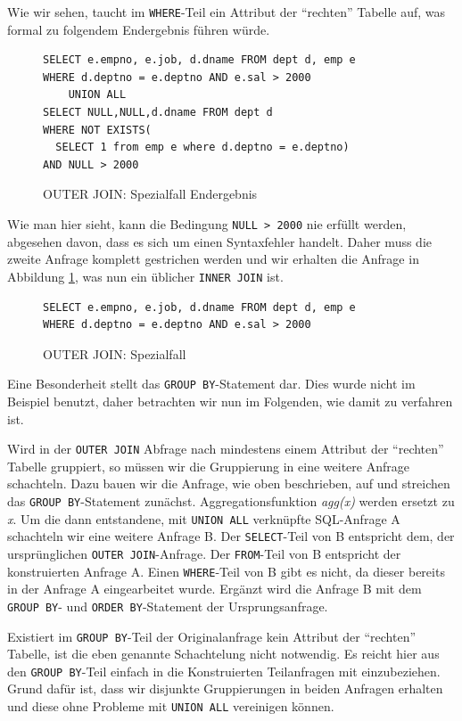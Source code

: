 Wie wir sehen, taucht im \verb|WHERE|-Teil ein Attribut der ``rechten'' Tabelle auf, was formal zu folgendem Endergebnis führen würde.

\begin{figure}[h]
\begin{verbatim}
SELECT e.empno, e.job, d.dname FROM dept d, emp e
WHERE d.deptno = e.deptno AND e.sal > 2000
    UNION ALL
SELECT NULL,NULL,d.dname FROM dept d 
WHERE NOT EXISTS(
  SELECT 1 from emp e where d.deptno = e.deptno)
AND NULL > 2000
\end{verbatim}
\caption{OUTER JOIN: Spezialfall Endergebnis}
\end{figure}

Wie man hier sieht, kann die Bedingung \verb|NULL > 2000| nie erfüllt werden, abgesehen davon, dass es sich um einen Syntaxfehler handelt. Daher muss die zweite Anfrage komplett gestrichen werden und wir erhalten die Anfrage in Abbildung \ref{fig:outjoinspez2}, was nun ein üblicher \verb|INNER JOIN| ist.

\begin{figure}[h]
\begin{verbatim}
SELECT e.empno, e.job, d.dname FROM dept d, emp e
WHERE d.deptno = e.deptno AND e.sal > 2000
\end{verbatim}
\caption{OUTER JOIN: Spezialfall}
\label{fig:outjoinspez2}
\end{figure}


Eine Besonderheit stellt das \verb|GROUP BY|-Statement dar. Dies wurde nicht im Beispiel benutzt, daher betrachten wir nun im Folgenden, wie damit zu verfahren ist.

Wird in der \verb|OUTER JOIN| Abfrage nach mindestens einem Attribut der ``rechten'' Tabelle gruppiert, so müssen wir die Gruppierung in eine weitere Anfrage schachteln. Dazu bauen wir die Anfrage, wie oben beschrieben, auf und streichen das \verb|GROUP BY|-Statement zunächst. Aggregationsfunktion \textit{agg(x)} werden ersetzt zu \textit{x}. Um die dann entstandene, mit \verb|UNION ALL| verknüpfte SQL-Anfrage A schachteln wir eine weitere Anfrage B. Der \verb|SELECT|-Teil von B entspricht dem, der ursprünglichen \verb|OUTER JOIN|-Anfrage. Der \verb|FROM|-Teil von B entspricht der konstruierten Anfrage A. Einen \verb|WHERE|-Teil von B gibt es nicht, da dieser bereits in der Anfrage A eingearbeitet wurde. Ergänzt wird die Anfrage B mit dem \verb|GROUP BY|- und \verb|ORDER BY|-Statement der Ursprungsanfrage.

Existiert im \verb|GROUP BY|-Teil der Originalanfrage kein Attribut der ``rechten'' Tabelle, ist die eben genannte Schachtelung nicht notwendig. Es reicht hier aus den \verb|GROUP BY|-Teil einfach in die Konstruierten Teilanfragen mit einzubeziehen. Grund dafür ist, dass wir disjunkte Gruppierungen in beiden Anfragen erhalten und diese ohne Probleme mit \verb|UNION ALL| vereinigen können.

